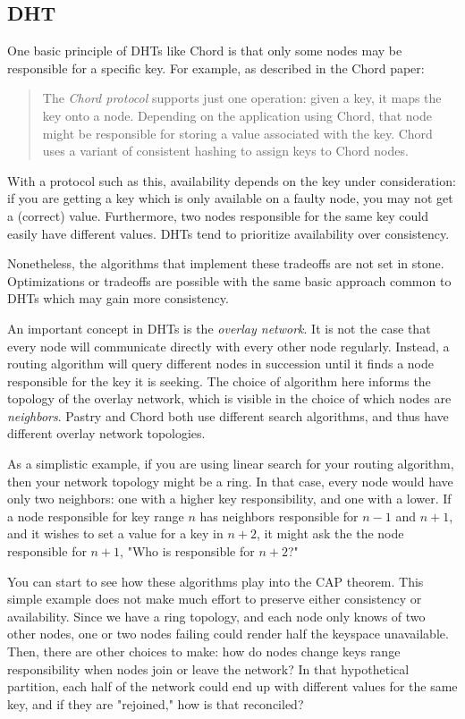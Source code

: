 \documentclass[12pt]{article}
\begin{document}
\subsection{DHT}

One basic principle of DHTs like Chord is that only some nodes may be responsible for a specific key. For example, as described in the Chord paper\cite{chord}:

\begin{quotation}
The {\em Chord protocol} supports just one operation: given a key,
it maps the key onto a node. Depending on the application using
Chord, that node might be responsible for storing a value associated
with the key. Chord uses a variant of consistent hashing to
assign keys to Chord nodes.
\end{quotation}

With a protocol such as this, availability depends on the key under consideration: if you are getting a key which is only available on a faulty node, you may not get a (correct) value. Furthermore, two nodes responsible for the same key could easily have different values. DHTs tend to prioritize availability over consistency.

Nonetheless, the algorithms that implement these tradeoffs are not set in stone. Optimizations or tradeoffs are possible with the same basic approach common to DHTs which may gain more consistency.

An important concept in DHTs is the {\em overlay network}. It is not the case that every node will communicate directly with every other node regularly. Instead, a routing algorithm will query different nodes in succession until it finds a node responsible for the key it is seeking. The choice of algorithm here informs the topology of the overlay network, which is visible in the choice of which nodes are {\em neighbors}. Pastry and Chord both use different search algorithms, and thus have different overlay network topologies.

As a simplistic example, if you are using linear search for your routing algorithm, then your network topology might be a ring. In that case, every node would have only two neighbors: one with a higher key responsibility, and one with a lower. If a node responsible for key range $n$ has neighbors responsible for $n-1$ and $n+1$, and it wishes to set a value for a key in $n+2$, it might ask the the node responsible for $n+1$, "Who is responsible for $n+2$?"

You can start to see how these algorithms play into the CAP theorem. This simple example does not make much effort to preserve either consistency or availability. Since we have a ring topology, and each node only knows of two other nodes, one or two nodes failing could render half the keyspace unavailable. Then, there are other choices to make: how do nodes change keys range responsibility when nodes join or leave the network? In that hypothetical partition, each half of the network could end up with different values for the same key, and if they are "rejoined," how is that reconciled?
\end{document}
